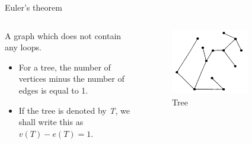 \documentclass{beamer}
\begin{document}
\begin{frame}{Euler's theorem}
\begin{columns}
\begin{column}{0.5\textwidth}
  \begin{definition}[Tree]
    A graph which does not contain any loops.
    \begin{itemize}
    \item For a tree, the number of vertices minus the number of edges is equal to 1.
    \item If the tree is denoted by \textsl{T}, we shall write this as $v(T) - e(T) = 1$.
    \end{itemize}
  \end{definition}
\end{column}
\begin{column}{0.5\textwidth}
    \begin{figure}
    \centering
        \includegraphics[width=0.7\textwidth]{figure_1_4_a.png}
        \caption{Tree}
    \end{figure}
\end{column}
\end{columns}
\end{frame}
\end{document}
